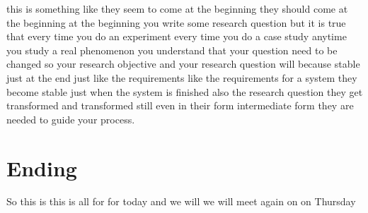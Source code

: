 \documentclass[conference, compsoc, twoside]{IEEEtran}
\begin{document}
  this is something like they seem to come at the beginning they should come at the beginning at the beginning you write some research question but it is true that every time you do an experiment every time you do a case study anytime you study a real phenomenon you understand that your question need to be changed so your research objective and your research question will because stable just at the end just like the requirements like the requirements for a system they become stable just when the system is finished also the research question they get transformed and transformed still even in their form intermediate form they are needed to guide your process.
 \section{Ending} %
 \label{sec:ending}
 So this is this is all for for today and we will we will meet again on on Thursday 
 

\end{document}
